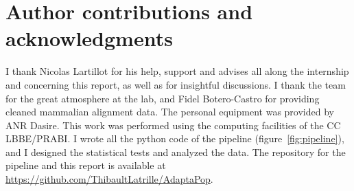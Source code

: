 \documentclass{article}
\begin{document}
\section*{Author contributions and acknowledgments}
I thank Nicolas Lartillot for his help, support and advises all along the internship and concerning this report, as well as for insightful discussions.
I thank the team for the great atmosphere at the lab, and Fidel Botero-Castro for providing cleaned mammalian alignment data.
The personal equipment was provided by ANR Dasire.
This work was performed using the computing  facilities of the CC LBBE/PRABI.
I wrote all the python code of the pipeline (figure~\ref{fig:pipeline}), and I designed the statistical tests and analyzed the data.
The repository for the pipeline and this report is available at \href{https://github.com/ThibaultLatrille/AdaptaPop}{https://github.com/ThibaultLatrille/AdaptaPop}.



\end{document}
